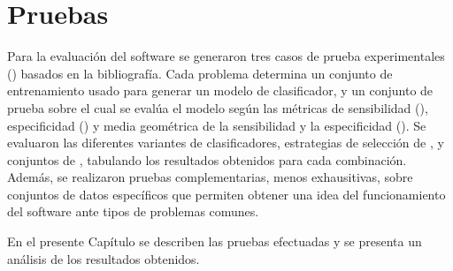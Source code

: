 %
%
%
%
\chapter{Pruebas}
%
Para la evaluación del software se generaron tres casos de prueba
experimentales () basados en la bibliografía.
Cada problema determina un conjunto de entrenamiento usado para
generar un modelo de clasificador, y un conjunto de prueba sobre el
cual se evalúa el modelo según las métricas de sensibilidad (\SE),
especificidad (\SP) y media geométrica de la sensibilidad y la
especificidad (\GM).
Se evaluaron las diferentes variantes de clasificadores, estrategias
de selección de , y conjuntos de , tabulando los
resultados obtenidos para cada combinación.
Además, se realizaron pruebas complementarias, menos exhausitivas,
sobre conjuntos de datos específicos que permiten obtener una idea del
funcionamiento del software ante tipos de problemas comunes.

En el presente Capítulo se describen las pruebas efectuadas y se
presenta un análisis de los resultados obtenidos.
